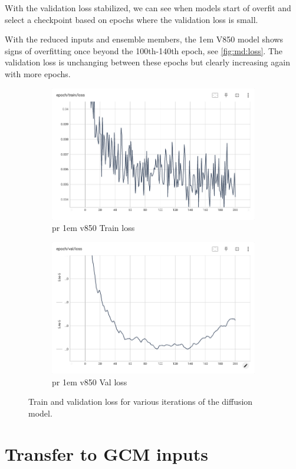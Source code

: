 With the validation loss stabilized, we can see when models start of overfit and select a checkpoint based on epochs where the validation loss is small.

With the reduced inputs and ensemble members, the 1em V850 model shows signs of overfitting once beyond the 100th-140th epoch, see \autoref{fig:md:loss}. The validation loss is unchanging between these epochs but clearly increasing again with more epochs.

\begin{figure}
  \centering
  \begin{subfigure}[b]{0.4\textwidth}
    \centering
    \includegraphics[width=\textwidth]{chapters/figures/3_md/loss/pr-1em-v850-train-loss.png}
      \caption{pr 1em v850 Train loss}
      \label{fig:md:1em-v850-train-loss}
  \end{subfigure}
  \hfill
  \begin{subfigure}[b]{0.4\textwidth}
      \centering
      \includegraphics[width=\textwidth]{chapters/figures/3_md/loss/pr-1em-v850-val-loss.png}
      \caption{pr 1em v850 Val loss}
      \label{fig:md:1em-v850-val-loss}
  \end{subfigure}
  \hfill
  \caption{Train and validation loss for various iterations of the diffusion model.}
  \label{fig:md:loss}
\end{figure}

\section{Transfer to GCM inputs}
